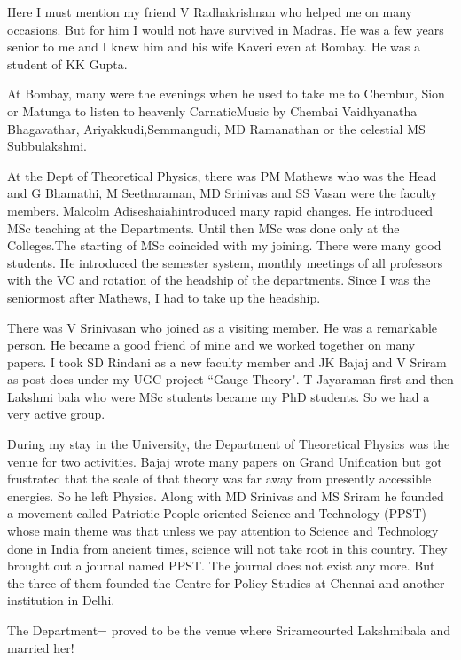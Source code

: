 Here I must mention my friend V Radhakrishnan who helped me on many 
occasions. But for him I would not have survived in Madras. He was a few 
years senior to me and I knew him and his wife Kaveri even at Bombay. He 
was a student of KK Gupta.

At Bombay, many were the evenings when he used to take me to Chembur, 
Sion or Matunga to listen to heavenly Carnatic\break Music by Chembai 
Vaidhyanatha Bhagavathar, Ariyakkudi,\break Semmangudi, MD Ramanathan or the 
celestial MS Subbulakshmi.

At the Dept of Theoretical Physics, there was PM Mathews who was the 
Head and G Bhamathi, M Seetharaman, MD Srinivas and SS Vasan were the 
faculty members. Malcolm Adiseshaiah\break introduced many rapid changes. He 
introduced MSc teaching at the Departments. Until then MSc was done only 
at the Colleges.\break The starting of MSc coincided with my joining. There 
were many good students. He introduced the semester system, monthly\break 
meetings of all professors with the VC and rotation of the headship of 
the departments. Since I was the seniormost after Mathews, I had to take 
up the headship.

There was V Srinivasan who joined as a visiting member. He was a 
remarkable person. He became a good friend of mine and we worked 
together on many papers. I took SD Rindani as a new faculty member and 
JK Bajaj and V Sriram as post-docs under my UGC project ``Gauge Theory". 
T Jayaraman first and then Lakshmi bala who were MSc students became my 
PhD students. So we had a very active group.

During my stay in the University, the Department of Theoreti\-cal Physics 
was the venue for two activities. Bajaj wrote many papers on Grand 
Unification but got frustrated that the scale of that theory was far 
away from presently accessible energies. So he left Physics. Along with 
MD Srinivas and MS Sriram he founded a movement called Patriotic 
People-oriented Science and Technology (PPST) whose main theme was that 
unless we pay attention to Science and Technology done in India from 
ancient times, science will not take root in this country. They brought 
out a journal named PPST. The journal does not exist any more. But the 
three of them founded the Centre for Policy Studies at Chennai and 
another institution in Delhi.

The Department= proved to be the venue where Sriram\break courted Lakshmibala 
and married her!
 
